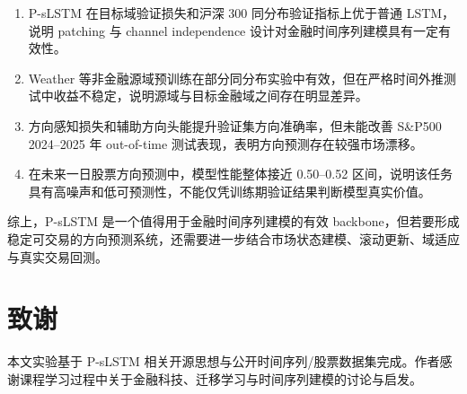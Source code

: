 \documentclass[UTF8,zihao=-4,twocolumn,fontset=fandol]{ctexart}
\begin{document}
\begin{enumerate}
  \item P-sLSTM 在目标域验证损失和沪深 300 同分布验证指标上优于普通 LSTM，说明 patching 与 channel independence 设计对金融时间序列建模具有一定有效性。
  \item Weather 等非金融源域预训练在部分同分布实验中有效，但在严格时间外推测试中收益不稳定，说明源域与目标金融域之间存在明显差异。
  \item 方向感知损失和辅助方向头能提升验证集方向准确率，但未能改善 S\&P500 2024--2025 年 out-of-time 测试表现，表明方向预测存在较强市场漂移。
  \item 在未来一日股票方向预测中，模型性能整体接近 0.50--0.52 区间，说明该任务具有高噪声和低可预测性，不能仅凭训练期验证结果判断模型真实价值。
\end{enumerate}

综上，P-sLSTM 是一个值得用于金融时间序列建模的有效 backbone，但若要形成稳定可交易的方向预测系统，还需要进一步结合市场状态建模、滚动更新、域适应与真实交易回测。

\section*{致谢}
本文实验基于 P-sLSTM 相关开源思想与公开时间序列/股票数据集完成。作者感谢课程学习过程中关于金融科技、迁移学习与时间序列建模的讨论与启发。

\clearpage
\twocolumn
{}
{}
{


}
\end{document}
